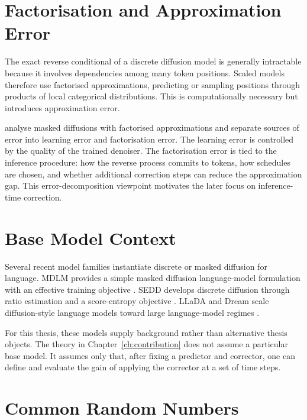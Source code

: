 \section{Factorisation and Approximation Error}
\label{sec:ch3-factorisation}

The exact reverse conditional of a discrete diffusion model is generally
intractable because it involves dependencies among many token positions. Scaled
models therefore use factorised approximations, predicting or sampling
positions through products of local categorical distributions. This is
computationally necessary but introduces approximation error.

\textcite{lavenant2025lz} analyse masked diffusions with factorised
approximations and separate sources of error into learning error and
factorisation error. The learning error is controlled by the quality of the
trained denoiser. The factorisation error is tied to the inference procedure:
how the reverse process commits to tokens, how schedules are chosen, and
whether additional correction steps can reduce the approximation gap. This
error-decomposition viewpoint motivates the later focus on inference-time
correction.

\section{Base Model Context}
\label{sec:ch3-base-model-context}

Several recent model families instantiate discrete or masked diffusion for
language. MDLM provides a simple masked diffusion language-model formulation
with an effective training objective \parencite{sahoo2024mdlm}. SEDD develops
discrete diffusion through ratio estimation and a score-entropy objective
\parencite{lou2024sedd}. LLaDA and Dream scale diffusion-style language models
toward large language-model regimes \parencite{nie2025llada,ye2025dream}.

For this thesis, these models supply background rather than alternative thesis
objects. The theory in Chapter~\ref{ch:contribution} does not assume a
particular base model. It assumes only that, after fixing a predictor and
corrector, one can define and evaluate the gain of applying the corrector at a
set of time steps.

\section{Common Random Numbers}
\label{sec:ch3-crn}

